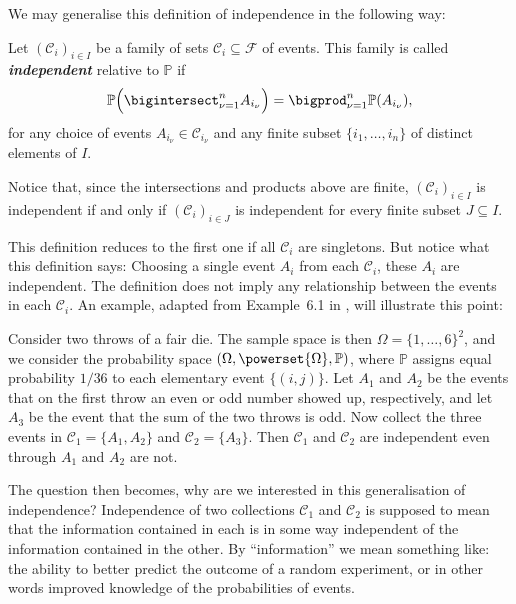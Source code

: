 \documentclass[article, a4paper, 11pt, oneside]{memoir}
\numberwithin{equation}{chapter}
\newcommand{\calF}{\mathcal{F}}
\newcommand{\calC}{\mathcal{C}}
\renewcommand{\P}{\mathbb{P}}
\newcommand{\keyword}[1]{{\itshape\bfseries #1}}
\begin{document}
We may generalise this definition of independence in the following way:

\begin{definition}[Independence II]
    \label{def:independence-2}
    Let $(\calC_i)_{i \in I}$ be a family of sets $\calC_i \subseteq \calF$ of events. This family is called \keyword{independent} relative to $\P$ if
    \begin{equation*}
        \P \Bigl( \bigintersect_{\nu = 1}^n A_{i_\nu} \Bigr)
            = \bigprod_{\nu = 1}^n \P(A_{i_\nu}),
    \end{equation*}
    for any choice of events $A_{i_\nu} \in \calC_{i_\nu}$ and any finite subset $\{ i_1, \ldots, i_n \}$ of distinct elements of $I$.
\end{definition}

\begin{remark}
    \label{rem:finite-subfamilies-independent}
    Notice that, since the intersections and products above are finite, $(\calC_i)_{i \in I}$ is independent if and only if $(\calC_i)_{i \in J}$ is independent for every finite subset $J \subseteq I$.
\end{remark}
%
This definition reduces to the first one if all $\calC_i$ are singletons. But notice what this definition says: Choosing a single event $A_i$ from each $\calC_i$, these $A_i$ are independent. The definition does not imply any relationship between the events in each $\calC_i$. An example, adapted from Example~6.1 in \textcite{bauer1995}, will illustrate this point:


\begin{example}
    \label{ex:die-throw-1}
    Consider two throws of a fair die. The sample space is then $\Omega = \{1, \ldots, 6\}^2$, and we consider the probability space $(\Omega, \powerset{\Omega}, \P)$, where $\P$ assigns equal probability $1/36$ to each elementary event $\{(i,j)\}$. Let $A_1$ and $A_2$ be the events that on the first throw an even or odd number showed up, respectively, and let $A_3$ be the event that the sum of the two throws is odd. Now collect the three events in $\calC_1 = \{A_1, A_2\}$ and $\calC_2 = \{A_3\}$. Then $\calC_1$ and $\calC_2$ are independent even through $A_1$ and $A_2$ are not.
\end{example}
%
The question then becomes, why are we interested in this generalisation of independence? Independence of two collections $\calC_1$ and $\calC_2$ is supposed to mean that the information contained in each is in some way independent of the information contained in the other. By \enquote{information} we mean something like: the ability to better predict the outcome of a random experiment, or in other words improved knowledge of the probabilities of events.
\end{document}
